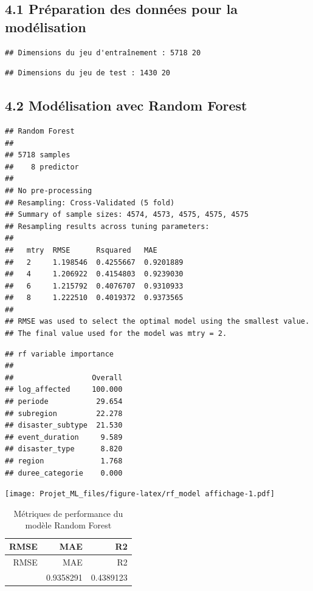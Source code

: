 \documentclass[
]{article}
\begin{document}
\subsection{4.1 Préparation des données pour la
modélisation}\label{pruxe9paration-des-donnuxe9es-pour-la-moduxe9lisation}

\begin{verbatim}
## Dimensions du jeu d'entraînement : 5718 20
\end{verbatim}

\begin{verbatim}
## Dimensions du jeu de test : 1430 20
\end{verbatim}

\subsection{4.2 Modélisation avec Random
Forest}\label{moduxe9lisation-avec-random-forest}

\begin{verbatim}
## Random Forest 
## 
## 5718 samples
##    8 predictor
## 
## No pre-processing
## Resampling: Cross-Validated (5 fold) 
## Summary of sample sizes: 4574, 4573, 4575, 4575, 4575 
## Resampling results across tuning parameters:
## 
##   mtry  RMSE      Rsquared   MAE      
##   2     1.198546  0.4255667  0.9201889
##   4     1.206922  0.4154803  0.9239030
##   6     1.215792  0.4076707  0.9310933
##   8     1.222510  0.4019372  0.9373565
## 
## RMSE was used to select the optimal model using the smallest value.
## The final value used for the model was mtry = 2.
\end{verbatim}

\begin{verbatim}
## rf variable importance
## 
##                  Overall
## log_affected     100.000
## periode           29.654
## subregion         22.278
## disaster_subtype  21.530
## event_duration     9.589
## disaster_type      8.820
## region             1.768
## duree_categorie    0.000
\end{verbatim}

\texttt{[image: Projet\_ML\_files/figure-latex/rf\_model affichage-1.pdf]}

\begin{longtable}[]{@{}rrr@{}}
\caption{Métriques de performance du modèle Random
Forest}\tabularnewline
\toprule\noalign{}
RMSE & MAE & R2 \\
\midrule\noalign{}
\endfirsthead
\toprule\noalign{}
RMSE & MAE & R2 \\
\midrule\noalign{}
\endhead
\bottomrule\noalign{}
\endlastfoot
1.202488 & 0.9358291 & 0.4389123 \\
\end{longtable}
\end{document}
